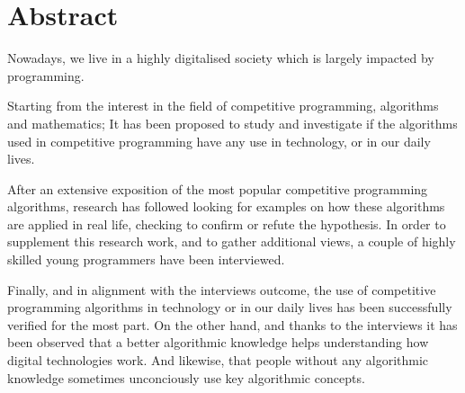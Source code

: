 \section{Abstract}

Nowadays, we live in a highly digitalised society which is largely impacted by programming. \newline 

Starting from the interest in the field of competitive programming, algorithms and mathematics; It has been proposed to study and investigate if the algorithms used in competitive programming have any use in technology, or in our daily lives.  \newline

After an extensive exposition of the most popular competitive programming algorithms, research has followed looking for examples on how these algorithms are applied in real life, checking to confirm or refute the hypothesis. In order to supplement this research work, and to gather additional views, a couple of highly skilled young programmers have been interviewed. \newline

Finally, and in alignment with the interviews outcome, the use of competitive programming algorithms in technology or in our daily lives has been successfully verified for the most part. On the other hand, and thanks to the interviews it has been observed that a better algorithmic knowledge helps understanding how digital technologies work. And likewise, that people without any algorithmic knowledge sometimes unconciously use key algorithmic concepts. \newline